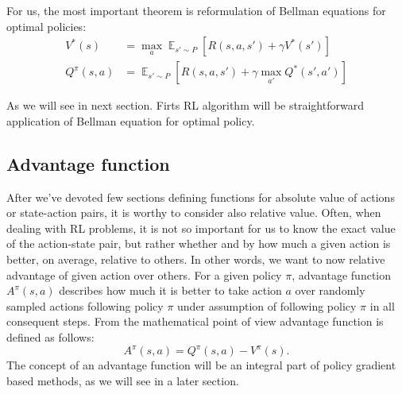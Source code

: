 For us, the most important theorem is reformulation of Bellman equations for optimal policies:
\begin{align*}
    V^*(s) &= \max_a \mathop{\mathbb{E}}_{s' \sim P} [R(s,a,s') + \gamma V^*(s')] \\
    Q^\pi(s,a) &= \mathop{\mathbb{E}}_{s' \sim P} [R(s,a,s') + \gamma \max_{a'} Q^*(s',a')]
\end{align*}

As we will see in next section. 
Firts RL algorithm will be straightforward application of Bellman equation for optimal policy. 

\subsection*{Advantage function}
After we've devoted few sections defining functions for absolute value of actions or state-action pairs, it is worthy to consider also relative value.
Often, when dealing with RL problems, it is not so important for us to know the exact value of the action-state pair, but rather whether and by how much a given action is better, on average, relative to others.
In other words, we want to now relative advantage of given action over others.
For a given policy $\pi$, advantage function $A^\pi(s,a)$ describes how much it is better to take action $a$ over randomly sampled actions following policy $\pi$ under assumption of following policy $\pi$ in all consequent steps.
From the mathematical point of view advantage function is defined as follows:
$$A^\pi(s,a) = Q^\pi(s,a) - V^\pi(s).$$
The concept of an advantage function will be an integral part of policy gradient based methods, as we will see in a later section.




